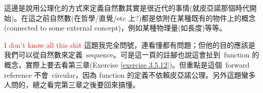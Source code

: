 \begin{remark}\label{remark 2.1.15}
這邊是說用公理化的方式來定義自然數其實是很近代的事情(就皮亞諾那個時代開始)。在這之前自然數(在哲學/直覺/etc 上?)都是依附在某種既有的物件上的概念(connected to some external concept)，例如某種物理量(如長度)等等。
\end{remark}

\begin{proposition}\label{prop 2.1.16}
\textcolor{red}{I don't know all this shit} 這題我完全問號，連看懂都有問題；但他的目的應該是我們可以從自然數來定義\ sequence。可是這一頁的註腳也說這會扯到\ function 的概念，實際上要去看第三章(Exercise \ref{exercise 3.5.12})。但重點是這個\ forward reference 不會\ circular，因為 function 的定義不依賴皮亞諾公理。另外這題蠻多人問的，總之看完第三章之後要回來搞懂。
\end{proposition}